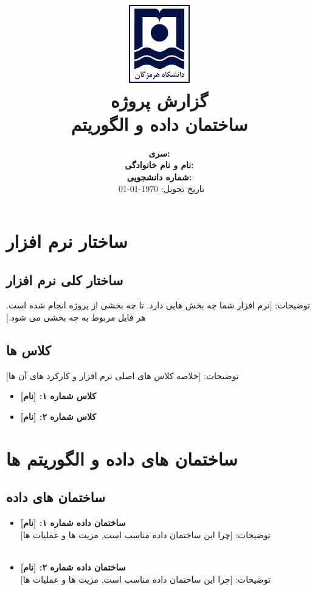 \documentclass[12pt]{article}
\title{
	\vspace*{-2cm}
	\includegraphics[width=0.2\textwidth]{university-logo}\\
	\vspace{1cm}
	\textcolor{primary}{\bfseries گزارش پروژه}\\
	\Huge ساختمان داده و الگوریتم
}
\author{
	\large
	\textbf{سری:} \hrulefill \\
	\vspace{0.5cm}
	\textbf{نام و نام خانوادگی:} \hrulefill \\
	\vspace{0.5cm}
	\textbf{شماره دانشجویی:} \hrulefill \\
	\vspace{1cm}
	\textcolor{primary}{\faCalendar\ تاریخ تحویل: \today}
}
\date{}
\begin{document}
	
	\maketitle
	\thispagestyle{empty}
	
	\newpage
	\renewcommand{\contentsname}{\textcolor{primary}{فهرست مطالب}}
	\tableofcontents
	\newpage
	
	
	\section{ساختار نرم افزار}
	\subsection{ساختار کلی نرم افزار}
	توضیحات: [نرم افزار شما چه بخش هایی دارد. تا چه بخشی از پروژه انجام شده است. هر فایل مربوط به چه بخشی می شود.]
	\subsection{کلاس ها}
	توضیحات: [خلاصه کلاس های اصلی نرم افزار و کارکرد های آن ها]
	\begin{itemize}[noitemsep]
		\item \textbf{کلاس شماره ۱: [نام]}\\
		\lipsum[8]
		\item \textbf{کلاس شماره ۲: [نام]}\\
		\lipsum[8]
		
	\end{itemize}
	\newpage
	\section{ساختمان های داده و الگوریتم ها}
\subsection{ساختمان های داده}
\begin{itemize}[noitemsep]
	\item \textbf{ساختمان داده شماره ۱: [نام]}\\
	توضیحات: [چرا این ساختمان داده مناسب است, مزیت ها و عملیات ها]\\
	\lipsum[8]
	\\
	\item \textbf{ساختمان داده شماره ۲: [نام]}\\
	توضیحات: [چرا این ساختمان داده مناسب است, مزیت ها و عملیات ها]\\
	\lipsum[8]
\end{itemize}
\end{document}
